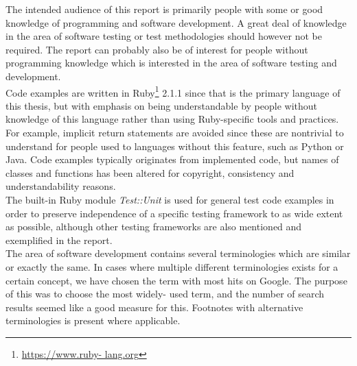 
The intended audience of this report is primarily people with some or
good knowledge of programming and software development. A great deal of
knowledge in the area of software testing or test methodologies should
however not be required. The report can probably also be of interest for
people without programming knowledge which is interested in the area of
software testing and development.\\

Code examples are written in Ruby\footnote{\url{https://www.ruby-
lang.org}} 2.1.1 since that is the primary language of this thesis, but
with emphasis on being understandable by people without knowledge of
this language rather than using Ruby-specific tools and practices. For
example, implicit return statements are avoided since these are
nontrivial to understand for people used to languages without this
feature, such as Python or Java. Code examples typically originates from
implemented code, but names of classes and functions has been altered
for copyright, consistency and understandability reasons.\\

The built-in Ruby module \emph{Test::Unit} is used for general test code
examples in order to preserve independence of a specific testing
framework to as wide extent as possible, although other testing
frameworks are also mentioned and exemplified in the report.\\

The area of software development contains several terminologies which
are similar or exactly the same. In cases where multiple different
terminologies exists for a certain concept, we have chosen the term with
most hits on Google. The purpose of this was to choose the most widely-
used term, and the number of search results seemed like a good measure
for this. Footnotes with alternative terminologies is present where
applicable.\\
